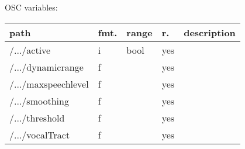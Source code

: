\begin{snugshade}
{\footnotesize
\label{osctab:tascaraplipsync}
OSC variables:
\nopagebreak

\begin{tabularx}{\textwidth}{llllX}
\hline
path & fmt. & range & r. & description\\
\hline
/.../active & i & bool & yes & \\
/.../dynamicrange & f &  & yes & \\
/.../maxspeechlevel & f &  & yes & \\
/.../smoothing & f &  & yes & \\
/.../threshold & f &  & yes & \\
/.../vocalTract & f &  & yes & \\
\hline
\end{tabularx}
}
\end{snugshade}
